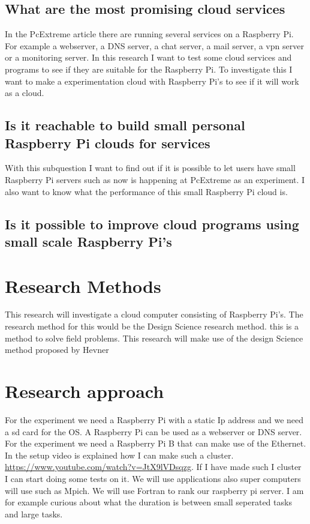 \documentclass{sig-alternate-br}
\begin{document}
\subsection{What are the most promising cloud services}
In the PcExtreme article \cite{Pcextreme} there are running several services on a Raspberry Pi.
For example a webserver, a DNS server, a chat server, a mail server, a vpn server or a monitoring server. 
In this research I want to test some cloud services and programs to see if they are suitable for the Raspberry Pi. 
To investigate this I want to make a experimentation cloud with Raspberry Pi's to see if it will work as a cloud. 



\subsection{Is it reachable to build small personal Raspberry Pi clouds for services}
With this subquestion I want to find out if it is possible to let users have small Raspberry Pi servers such as now is happening at PcExtreme as an experiment. I also want to know what the performance of this small Raspberry Pi cloud is. 

\subsection{Is it possible to improve cloud programs using small scale Raspberry Pi's}


\section{Research Methods}
This research will investigate a cloud computer consisting of Raspberry Pi's. The research method for this would be the Design Science research method. this is a method to solve field problems. This research will make use of the design Science method proposed by Hevner\cite{hevner:2007}

\section{Research approach}
For the experiment we need a Raspberry Pi with a static Ip address and we need a sd card for the OS.  A Raspberry Pi can be used as a webserver or DNS server. For the experiment we need a Raspberry Pi B that can make use of the Ethernet.
In the setup video is explained how I can make such a cluster.
\url{https://www.youtube.com/watch?v=JtX9lVDsqzg}.
If I have made such I cluster I can start doing some tests on it. We will use applications also super computers will use such as Mpich. We will use Fortran to rank our raspberry pi server. 
I am for example curious about what the duration is between small seperated tasks and large tasks. 
\end{document}
